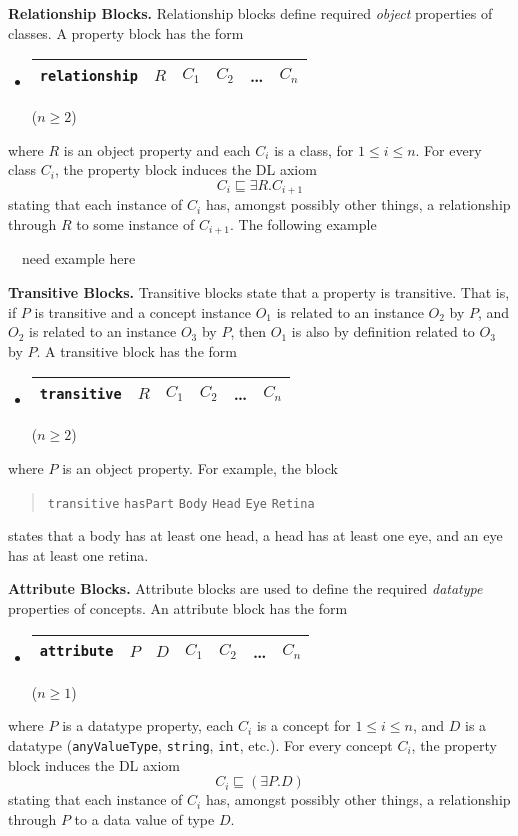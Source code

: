 \documentclass[preprint,number]{elsarticle}
\newcommand{\myblock}[1]{\vspace{12pt}\noindent\textbf{#1}}
\begin{document}
\myblock{Relationship Blocks.} Relationship blocks define required
\emph{object} properties of classes. A property block has the form
\begin{itemize}
\item[]
  \begin{tabular}{|l|l|l|l|l|l|}\hline \texttt{relationship} & $R$ & $C_1$
    & $C_2$ & \dots & $C_n$ \\ \hline
  \end{tabular} \hfill ($n \ge 2$)
\end{itemize}
where $R$ is an object property and each $C_i$ is a class, for $1 \le
i \le n$.  For every class $C_i$, the property block induces the DL
axiom \[C_i \sqsubseteq \exists R . C_{i+1} \] stating that each
instance of $C_i$ has, amongst possibly other things, a relationship
through $R$ to some instance of $C_{i+1}$.  The following example
\begin{tabbing}
   ~~need example here
\end{tabbing}




\myblock{Transitive Blocks.} Transitive blocks state that a property
is transitive. That is, if $P$ is transitive and a concept instance
$O_1$ is related to an instance $O_2$ by $P$, and $O_2$ is related to
an instance $O_3$ by $P$, then $O_1$ is also by definition related to
$O_3$ by $P$. A transitive block has the form
\begin{itemize}
\item[]
  \begin{tabular}{|l|l|l|l|l|l|}\hline \texttt{transitive} & $R$ & $C_1$
    & $C_2$ & \dots & $C_n$ \\ \hline
  \end{tabular} \hfill ($n \ge 2$)
\end{itemize}
where $P$ is an object property. For example, the block
\begin{quote}\texttt{transitive} \texttt{hasPart} \texttt{Body}
  \texttt{Head} \texttt{Eye} \texttt{Retina}
\end{quote} states that a body has at least one head, a head has at
least one eye, and an eye has at least one retina.



\myblock{Attribute Blocks.} Attribute blocks are used to define the
required \emph{datatype} properties of concepts. An attribute block
has the form
\begin{itemize}
\item[]
  \begin{tabular}{|l|l|l|l|l|l|l|}\hline \texttt{attribute} & $P$ & $D$ & $C_1$
    & $C_2$ & \dots & $C_n$ \\ \hline
  \end{tabular} \hfill ($n \ge 1$)
\end{itemize}
where $P$ is a datatype property, each $C_i$ is a concept for $1 \le i
\le n$, and $D$ is a datatype (\texttt{anyValueType}, \texttt{string},
\texttt{int}, etc.). For every concept $C_i$, the property block
induces the DL axiom \[C_i \sqsubseteq (\exists P . D)\] stating that
each instance of $C_i$ has, amongst possibly other things, a
relationship through $P$ to a data value of type $D$.
\end{document}
